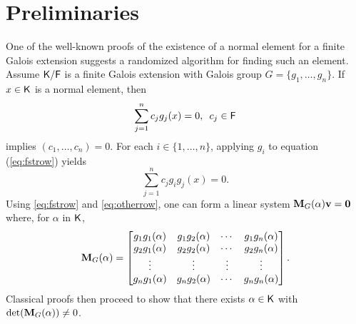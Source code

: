 \section{Preliminaries}
\label{sec:pre}

One of the well-known proofs of the existence of a normal element for
a finite Galois extension \cite[Theorem 6.13.1]{Lang} suggests a
randomized algorithm for finding such an element. Assume ${\mathsf{K}}/{\mathsf{F}}$ is a
finite Galois extension with Galois group $G = \lbrace g_1 , \ldots ,
g_n \rbrace$. If $x \in {\mathsf{K}}$ is a normal element, then
\begin{equation}
  \label{eq:fstrow}
  \sum_{j=1}^n 
  c_j g_j(x)=0, \,\,\, c_j \in {\mathsf{F}} 
\end{equation} 
implies $(c_1, \ldots ,c_n) = 0$. For each $i \in \lbrace 1, \ldots , n\rbrace$, applying $g_i$ to equation (\ref{eq:fstrow}) yields
\begin{equation} \label{eq:otherrow}
 \sum_{j=1}^n 
 c_j g_i g_j(x)=0.
\end{equation}
Using \eqref{eq:fstrow} and \eqref{eq:otherrow}, one can form a linear system $\mat{M}_G(\alpha)\textbf{v} = \textbf{0}$ where,
for $\alpha$ in ${\mathsf{K}}$,
 $$ \mat M_G(\alpha) =
\begin{bmatrix}
g_1 g_1(\alpha) & g_1 g_2(\alpha) & \cdots & g_1 g_n(\alpha) \\
g_2 g_1(\alpha) & g_2 g_2(\alpha) & \cdots & g_2 g_n(\alpha) \\
\vdots		& \vdots	& \vdots & \vdots \\
g_n g_1(\alpha) & g_n g_2(\alpha) & \cdots & g_n g_n(\alpha) \\
\end{bmatrix}. 
$$ Classical proofs then proceed to show that there exists $\alpha \in {\mathsf{K}}$ with
$\det(\mat M_G(\alpha))\neq 0$.
 
